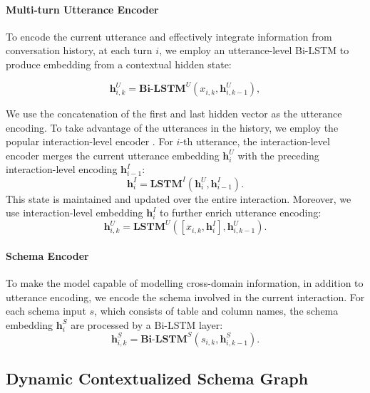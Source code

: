 \documentclass[letterpaper]{article} \usepackage{aaai21}  \usepackage{times}  \usepackage{helvet} \usepackage{courier}  \usepackage[hyphens]{url}  \usepackage{graphicx} \urlstyle{rm} \def\UrlFont{\rm}  \usepackage{natbib}  \usepackage{caption} \frenchspacing  \setlength{\pdfpagewidth}{8.5in}  \setlength{\pdfpageheight}{11in}
\begin{document}
\paragraph{Multi-turn Utterance Encoder} To encode the current utterance and effectively integrate information from conversation history, 
at each turn $i$, we employ an utterance-level Bi-LSTM \cite{DBLP:journals/neco/HochreiterS97} to produce embedding from a contextual hidden state:

\begin{equation}
{\mathbf{h}}_{i, k}^{U}=\textbf{Bi-LSTM}^{U}\left(x_{i, k}, {\mathbf{h}}_{i, k-1}^{U}\right) ,
\end{equation}

We use the concatenation of the first and last hidden vector as the utterance encoding.
To take advantage of the utterances in the history, we employ the popular interaction-level encoder \cite{DBLP:conf/naacl/SuhrIA18}. For $i$-th utterance, 
the interaction-level encoder  merges the current utterance embedding $\mathbf{h}_{i}^{U}$ with the preceding interaction-level encoding $\mathbf{h}_{i-1}^{I}$:
\begin{equation}
\mathbf{h}_{i}^{I}=\textbf{LSTM}^{I}\left(\mathbf{h}_{i}^{U}, \mathbf{h}_{i-1}^{I}\right).
\end{equation}
This state is maintained and updated over the entire interaction.
Moreover, we use interaction-level embedding $\mathbf{h}_{i}^{I}$ to further enrich utterance encoding:
\begin{equation}
{\mathbf{h}}_{i, k}^{U}=\textbf{LSTM}^{U}\left([x_{i, k}, \mathbf{h}_{i}^{I}], {\mathbf{h}}_{i, k-1}^{U}\right) .
\end{equation}


\paragraph{Schema Encoder}
To make the model capable of modelling cross-domain information, in addition to utterance encoding, we encode the schema involved in the current interaction.
For each schema input $s$, which consists of table and column names, the schema embedding $\mathbf{h}_{i}^{S}$ are processed by a Bi-LSTM layer:
\begin{equation}
{\mathbf{h}}_{i, k}^{S}=\textbf{Bi-LSTM}^{S}\left(s_{i, k}, {\mathbf{h}}_{i, k-1}^{S}\right).
\end{equation}

\subsection{Dynamic Contextualized Schema Graph}
\label{dynamic graph}
\end{document}
